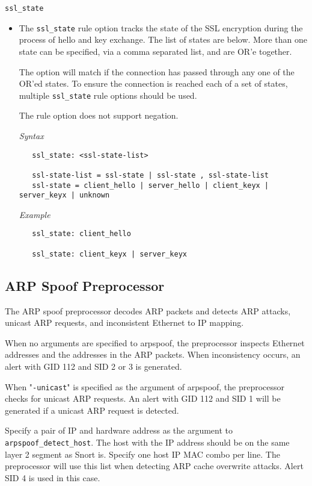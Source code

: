 \documentclass[english]{report}
\begin{document}
\texttt{ssl\_state}
\label{ssl:ssl_state}
\begin{itemize}
    
\item[] The \texttt{ssl\_state} rule option tracks the state of the SSL encryption
during the process of hello and key exchange.  The list of states are below.  More than
one state can be specified, via a comma separated list, and are OR'e together.

The option will match if the connection has passed through any one of the OR'ed states.
To ensure the connection is reached each of a set of states, multiple \texttt{ssl\_state}
rule options should be used.

The rule option does not support negation. 

\textit{Syntax}
\footnotesize
\begin{verbatim}
   ssl_state: <ssl-state-list>

   ssl-state-list = ssl-state | ssl-state , ssl-state-list
   ssl-state = client_hello | server_hello | client_keyx | server_keyx | unknown
\end{verbatim}


\textit{Example}
\begin{verbatim}
   ssl_state: client_hello

   ssl_state: client_keyx | server_keyx
\end{verbatim}

\end{itemize}

\subsection{ARP Spoof Preprocessor}
\label{sub:arpspoof}

The ARP spoof preprocessor decodes ARP packets and detects ARP attacks, unicast
ARP requests, and inconsistent Ethernet to IP mapping.

When no arguments are specified to arpspoof, the preprocessor inspects Ethernet
addresses and the addresses in the ARP packets. When inconsistency occurs, an
alert with GID 112 and SID 2 or 3 is generated.

When "\texttt{-unicast}" is specified as the argument of arpspoof, the
preprocessor checks for unicast ARP requests. An alert with GID 112 and SID 1
will be generated if a unicast ARP request is detected.

Specify a pair of IP and hardware address as the argument to
\texttt{arpspoof\_detect\_host}.  The host with the IP address should be on the
same layer 2 segment as Snort is.  Specify one host IP MAC combo per line. The
preprocessor will use this list when detecting ARP cache overwrite attacks.
Alert SID 4 is used in this case.
\end{document}
